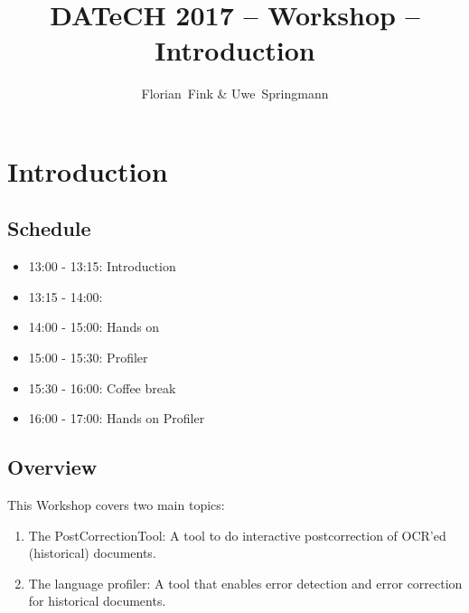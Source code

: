 
\title{DATeCH 2017 -- \pocoto{} Workshop -- Introduction}
\author{Florian~Fink \& Uwe~Springmann}



\begin{frame}
	\titlepage
\end{frame}

\section{Introduction}
\subsection{Schedule}
\begin{frame}
	\begin{itemize}
		\item 13:00 - 13:15: Introduction
		\item 13:15 - 14:00: \pocoto{}
		\item 14:00 - 15:00: Hands on \pocoto{}
		\item 15:00 - 15:30: Profiler
		\item 15:30 - 16:00: Coffee break
		\item 16:00 - 17:00: Hands on Profiler
	\end{itemize}
\end{frame}

\subsection{Overview}
\begin{frame}
	This Workshop covers two main topics:
	\begin{enumerate}
		\item The \pocoto{} PostCorrectionTool: A tool to do interactive
			postcorrection of OCR'ed (historical) documents.
		\item The language profiler: A tool that enables error detection and error
			correction for historical documents.
	\end{enumerate}
\end{frame}

